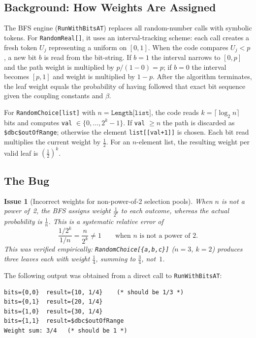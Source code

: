 \documentclass[12pt,a4paper]{article}
\theoremstyle{critical}
\newtheorem{issue}{Issue}
\theoremstyle{remark}
\begin{document}
\subsection{Background: How Weights Are Assigned}

The BFS engine (\texttt{RunWithBitsAT}) replaces all random-number calls with symbolic
tokens. For \texttt{RandomReal[]}, it uses an interval-tracking scheme: each call
creates a fresh token $U_j$ representing a uniform on $[0,1]$. When the code compares
$U_j < p$, a new bit $b$ is read from the bit-string. If $b=1$ the interval narrows to
$[0, p]$ and the path weight is multiplied by $p/(1-0) = p$; if $b=0$ the interval becomes
$[p,1]$ and weight is multiplied by $1-p$. After the algorithm terminates, the leaf weight
equals the probability of having followed that exact bit sequence given the coupling
constants and $\beta$.

For \texttt{RandomChoice[list]} with $n = \texttt{Length[list]}$, the code reads
$k = \lceil \log_2 n \rceil$ bits and computes \texttt{val} $\in \{0,\ldots, 2^k-1\}$.
If \texttt{val} $\geq n$ the path is discarded as \texttt{\$dbc\$outOfRange}; otherwise
the element \texttt{list[[val+1]]} is chosen. Each bit read multiplies the current weight
by $\tfrac{1}{2}$. For an $n$-element list, the resulting weight per valid leaf is
$\left(\tfrac{1}{2}\right)^k$.

\subsection{The Bug}

\begin{issue}[Incorrect weights for non-power-of-2 selection pools]
\label{issue:weight}
When $n$ is not a power of~2, the BFS assigns weight $\tfrac{1}{2^k}$ to each
outcome, whereas the actual probability is $\tfrac{1}{n}$. This is a systematic
relative error of
\[
  \frac{1/2^k}{1/n} = \frac{n}{2^k} \neq 1 \qquad \text{when } n \text{ is not a power of } 2.
\]
This was verified empirically: \texttt{RandomChoice[\{a,b,c\}]} ($n=3$, $k=2$) produces
three leaves each with weight $\tfrac{1}{4}$, summing to $\tfrac{3}{4}$, not~$1$.
\end{issue}

The following output was obtained from a direct call to \texttt{RunWithBitsAT}:
\begin{lstlisting}
bits={0,0}  result={10, 1/4}    (* should be 1/3 *)
bits={0,1}  result={20, 1/4}
bits={1,0}  result={30, 1/4}
bits={1,1}  result=$dbc$outOfRange
Weight sum: 3/4   (* should be 1 *)
\end{lstlisting}
\end{document}
